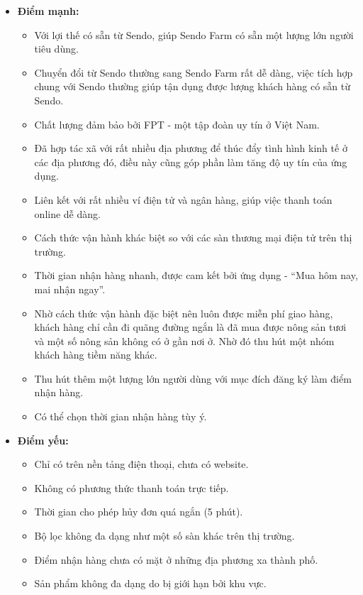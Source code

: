 \begin{itemize}
    \item \textbf{Điểm mạnh:}
        \begin{itemize}
            \item Với lợi thế có sẵn từ Sendo, giúp Sendo Farm có sẵn một lượng lớn người tiêu dùng.
            \item Chuyển đổi từ Sendo thường sang Sendo Farm rất dễ dàng, việc tích hợp chung với Sendo thường giúp tận dụng được lượng khách hàng có sẵn từ Sendo.
            \item Chất lượng đảm bảo bởi FPT - một tập đoàn uy tín ở Việt Nam.
            \item Đã hợp tác xã với rất nhiều địa phương để thúc đẩy tình hình kinh tế ở các địa phương đó, điều này cũng góp phần làm tăng độ uy tín của ứng dụng.
            \item Liên kết với rất nhiều ví điện tử và ngân hàng, giúp việc thanh toán online dễ dàng.
            \item Cách thức vận hành khác biệt so với các sàn thương mại điện tử trên thị trường.
            \item Thời gian nhận hàng nhanh, được cam kết bởi ứng dụng - “Mua hôm nay, mai nhận ngay”.
            \item Nhờ cách thức vận hành đặc biệt nên luôn được miễn phí giao hàng, khách hàng chỉ cần đi quãng đường ngắn là đã mua được nông sản tươi và một số nông sản không có ở gần nơi ở. Nhờ đó thu hút một nhóm khách hàng tiềm năng khác.
            \item Thu hút thêm một lượng lớn người dùng với mục đích đăng ký làm điểm nhận hàng.
            \item Có thể chọn thời gian nhận hàng tùy ý.
        \end{itemize}
    \item \textbf{Điểm yếu:}
        \begin{itemize}
            \item Chỉ có trên nền tảng điện thoại, chưa có website.
            \item Không có phương thức thanh toán trực tiếp.
            \item Thời gian cho phép hủy đơn quá ngắn (5 phút).
            \item Bộ lọc không đa dạng như một số sàn khác trên thị trường.
            \item Điểm nhận hàng chưa có mặt ở những địa phương xa thành phố.
            \item Sản phẩm không đa dạng do bị giới hạn bởi khu vực.
        \end{itemize}
\end{itemize}

